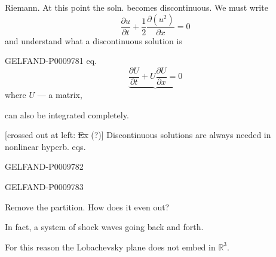 Riemann. At this point the soln. becomes discontinuous. We must write
\[
 \frac{\partial u}{\partial t}+\frac12\frac{\partial(u^2)}{\partial x}=0
\]
and understand what a discontinuous solution is

\begin{GelfandAdjacentEvidence}{GELFAND-P000978}{1}
 eq.
\[
 \underbrace{\frac{\partial U}{\partial t}+U\frac{\partial U}{\partial x}=0}
\]
where $U$ --- a matrix,

can also be integrated completely.

[crossed out at left: \sout{Ex} (?)] Discontinuous solutions are always needed in nonlinear hyperb. eqs.
\end{GelfandAdjacentEvidence}
\begin{GelfandAdjacentEvidence}{GELFAND-P000978}{2}


\end{GelfandAdjacentEvidence}
\begin{GelfandAdjacentEvidence}{GELFAND-P000978}{3}


Remove the partition. How does it even out?

In fact, a system of shock waves going back and forth.

For this reason the Lobachevsky plane does not embed in $\mathbb R^3$.
\end{GelfandAdjacentEvidence}
